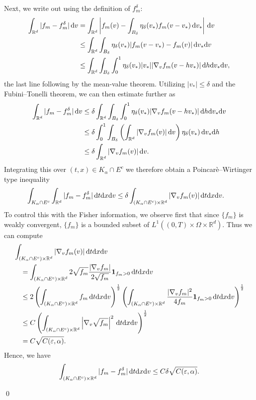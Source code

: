 \documentclass[10pt, reqno]{amsart}
\theoremstyle{plain}
\theoremstyle{definition}
\theoremstyle{remark}
\renewenvironment{proof}[1][\proofname]{\noindent{\scshape #1.\quad}}{\qed}
\numberwithin{equation}{section}
\newcommand{\R}{\mathbb{R}}
\newcommand{\ve}{\varepsilon}
\newcommand{\dx}{\textnormal{d}x}
\newcommand{\dv}{\textnormal{d}v}
\newcommand{\dt}{\textnormal{d}t}
\newcommand{\tnd}{\textnormal{d}}
\newcommand{\intr}{\int_{\R^d}}
\begin{document}
\begin{proof}[Proof of Lemma \ref{lem: key compactness}]
    Next, we write out using the definition of $f_m^\delta$:
    \begin{align*}
        \int_{\R^d} |f_m - f_m^\delta|\,\dv &= \intr  \left|f_m(v) - \int_{B_\delta} \eta_\delta(v_*) f_m(v-v_*) \,\dv_* \right|\,\dv \\
        &\le \int_{\R^d} \int_{B_\delta} \eta_\delta(v_*) |f_m(v-v_*) - f_m(v)| \,\dv_* \dv \\
        &\le \int_{\R^d} \int_{B_\delta} \int_0^1 \eta_\delta(v_*)  |v_*| |\nabla_v f_m(v- hv_*)| \,\tnd h \dv_* \dv,
    \end{align*}
    the last line following by the mean-value theorem. Utilizing $|v_*|\le \delta$ and the Fubini--Tonelli theorem, we can then estimate further as
    \begin{align*}
        \int_{\R^d} |f_m - f_m^\delta|\,\dv &\le \delta \int_{\R^d} \int_{B_\delta} \int_0^1 \eta_\delta(v_*) |\nabla_v f_m(v-hv_*)| \,\tnd h \dv_* \dv \\
        &\le \delta \int_0^1 \int_{B_\delta} \left(\int_{\R^d} |\nabla_v f_m(v)| \,\dv \right) \eta_\delta(v_*)\,\dv_* \tnd h \\
        &\le \delta \int_{\R^d} |\nabla_v f_m(v)|\,\dv.
    \end{align*}
    Integrating this over $(t,x)\in K_\alpha \cap E^c$ we therefore obtain a Poincar\`e--Wirtinger type inequality
    \begin{align*}
        \int_{K_\alpha \cap E^c} \int_{\R^d} |f_m - f_m^\delta|\,\dt\dx\dv &\le \delta \int_{(K_\alpha\cap E^c)\times \R^d} |\nabla_v f_m(v)|\,\dt\dx\dv. 
    \end{align*}
    To control this with the Fisher information, we observe first that since $\{f_m\}$ is weakly convergent, $\{f_m\}$ is a bounded subset of $L^1((0,T)\times\Omega\times\R^d)$. Thus we can compute
    \begin{align*}
        &\int_{(K_\alpha \cap E^c)\times\R^d} |\nabla_v f_m(v)| \,\dt\dx\dv \\
        &\quad = \int_{(K_\alpha \cap E^c)\times\R^d} 2\sqrt{f_m} \frac{|\nabla_v f_m|}{2\sqrt{f_m}} \mathbf{1}_{f_m>0} \,\dt\dx\dv \\
        &\quad \le 2\left(\int_{(K_\alpha \cap E^c)\times\R^d} f_m\,\dt\dx\dv\right)^{\frac{1}{2}} \left(\int_{(K_\alpha \cap E^c)\times\R^d} \frac{|\nabla_v f_m|^2}{4f_m} \mathbf{1}_{f_m>0} \,\dt\dx\dv\right)^{\frac{1}{2}} \\
        &\quad \le C \left(\int_{(K_\alpha \cap E^c)\times\R^d} \left|\nabla_v \sqrt{f_m}\right|^2 \,\dt\dx\dv\right)^{\frac{1}{2}} \\
        &\quad = C\sqrt{C(\ve,\alpha)}.
    \end{align*}
    Hence, we have
    \begin{equation} \label{eq: error}
        \int_{(K_\alpha \cap E^c)\times\R^d} |f_m - f_m^\delta|\,\dt\dx\dv \le C\delta \sqrt{C(\ve,\alpha)}.
    \end{equation}


\end{proof}
\end{document}
